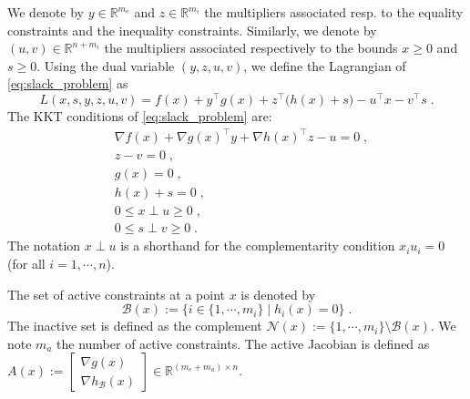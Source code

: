 We denote by $y \in \mathbb{R}^{m_e}$ and $z \in \mathbb{R}^{m_i}$ the multipliers associated
resp. to the equality constraints and the inequality constraints.
Similarly, we denote
by $(u, v) \in \mathbb{R}^{n + m_i}$ the multipliers associated
respectively to the bounds $x \geq 0$ and $s \geq 0$.
Using the dual variable $(y, z, u, v)$, we define the Lagrangian of \eqref{eq:slack_problem} as
\begin{equation}
  \label{eq:lagrangian}
  L(x, s, y, z, u, v) = f(x) + y^\top g(x) + z^\top \big(h(x) +s\big)
  - u^\top x - v^\top s \; .
\end{equation}
The KKT conditions of \eqref{eq:slack_problem} are:
\begin{subequations}
  \label{eq:kktconditions}
    \begin{align}
      & \nabla f(x) + \nabla g(x)^\top y + \nabla h(x)^\top z - u = 0 \; , \\
      & z - v = 0 \; , \\
      & g(x) = 0 \; , \\
      & h(x) + s = 0 \; , \\
      \label{eq:kktconditions:compx}
      & 0 \leq x \perp u \geq 0 \; , \\
      \label{eq:kktconditions:comps}
      & 0 \leq s \perp v \geq 0 \; .
    \end{align}
\end{subequations}
The notation $x \perp u$ is a shorthand for the complementarity
condition $x_i u_i = 0$ (for all $i=1,\cdots, n$).

The set of active constraints at a point $x$ is denoted by
\begin{equation}
  \mathcal{B}(x) := \{ i \in\{ 1, \cdots, m_i\} \; | \; h_i(x) = 0 \} \; .
\end{equation}
The inactive set is defined as the complement $\mathcal{N}(x) := \{1, \cdots, m_i \} \setminus \mathcal{B}(x)$.
We note $m_a$ the number of active constraints.
The active Jacobian is defined as $A(x) := \begin{bmatrix} \nabla g(x) \\ \nabla h_{\mathcal{B}}(x) \end{bmatrix} \in \mathbb{R}^{(m_e + m_a) \times n}$.


